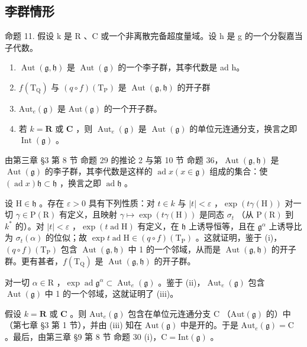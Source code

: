 \subsection{李群情形}

命题 11. 假设 k 是 R 、C 或一个非离散完备超度量域。设 h 是 g 的一个分裂嘉当子代数。

\begin{enumerate}
\def\labelenumi{(\roman{enumi})}
\item
  \(\operatorname{Aut}(\mathfrak{g},\mathfrak{h})\) 是 \(\operatorname{Aut}(\mathfrak{g})\) 的一个李子群，其李代数是 ad h。
\item
  \(f(\mathrm{T}_{\mathrm{Q}})\) 与 \((q\circ f)(\mathrm{T}_{\mathrm{P}})\) 是 \(\operatorname {Aut}(\mathfrak{g},\mathfrak{h})\) 的开子群
\item
  \(\mathrm{Aut}_e(\mathfrak{g})\) 是 \(\mathrm{Aut}(\mathfrak{g})\) 的一个开子群。
\item
  若 \(k = \mathbf{R}\) 或 \(\mathbf{C}\) ，则 \(\operatorname{Aut}_e(\mathfrak{g})\) 是 \(\operatorname{Aut}(\mathfrak{g})\) 的单位元连通分支，换言之即 \(\operatorname{Int}(\mathfrak{g})\) 。
\end{enumerate}

由第三章 §3 第 8 节 命题 29 的推论 2 与第 10 节 命题 36，\(\operatorname{Aut}(\mathfrak{g}, \mathfrak{h})\) 是 \(\operatorname{Aut}(\mathfrak{g})\) 的李子群，其李代数是这样的 \(\operatorname{ad} x (x \in \mathfrak{g})\) 组成的集合：使 \((\operatorname{ad} x) \mathfrak{h} \subset \mathfrak{h}\) ，换言之即 \(\operatorname{ad} \mathfrak{h}\) 。

设 \(\mathrm{H} \in \mathfrak{h}\) 。存在 \(\varepsilon > 0\) 具有下列性质：对 \(t \in k\) 与 \(|t| < \varepsilon\) ，\(\exp(t\gamma(\mathrm{H}))\) 对一切 \(\gamma \in \mathrm{P}(\mathrm{R})\) 有定义，且映射 \(\gamma \mapsto \exp(t\gamma(\mathrm{H}))\) 是同态 \(\sigma_t\) （从 \(\mathrm{P}(\mathrm{R})\) 到 \(k^*\) 的）。对 \(|t| < \varepsilon\) ，\(\exp(t\operatorname{ad}\mathrm{H})\) 有定义，在 \(\mathfrak{h}\) 上诱导恒等，且在 \(\mathfrak{g}^\alpha\) 上诱导比为 \(\sigma_t(\alpha)\) 的位似；故 \(\exp t\operatorname{ad}\mathrm{H} \in (q \circ f)(\mathrm{T}_{\mathrm{P}})\) 。这就证明，鉴于 (i)，\((q \circ f)(\mathrm{T}_{\mathrm{P}})\) 包含 \(\operatorname{Aut}(\mathfrak{g},\mathfrak{h})\) 中 1 的一个邻域，从而是 \(\operatorname{Aut}(\mathfrak{g},\mathfrak{h})\) 的开子群。更有甚者，\(f(\mathrm{T}_{\mathrm{Q}})\) 是 \(\operatorname{Aut}(\mathfrak{g},\mathfrak{h})\) 的开子群。

对一切 \(\alpha \in \mathrm{R}\) ，\(\exp \operatorname{ad} \mathfrak{g}^{\alpha} \subset \operatorname{Aut}_{e}(\mathfrak{g})\) 。鉴于 (ii)，\(\operatorname{Aut}_{e}(\mathfrak{g})\) 包含 \(\operatorname{Aut}(\mathfrak{g})\) 中 1 的一个邻域，这就证明了 (iii)。

假设 \(k = \mathbf{R}\) 或 \(\mathbf{C}\) 。则 \(\mathrm{Aut}_e(\mathfrak{g})\) 包含在单位元连通分支 \(\mathrm{C}\) （\(\mathrm{Aut}(\mathfrak{g})\) 的）中（第七章 §3 第 1 节），并由 (iii) 知在 \(\mathrm{Aut}(\mathfrak{g})\) 中是开的。于是 \(\mathrm{Aut}_e(\mathfrak{g}) = \mathrm{C}\) 。最后，由第三章 §9 第 8 节 命题 30 (i)，\(\mathrm{C} = \mathrm{Int}(\mathfrak{g})\) 。

